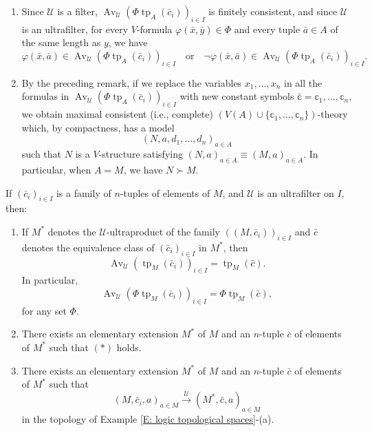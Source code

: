 \documentclass{scrartcl}
\DeclareMathOperator{\Av}{Av }
\DeclareMathOperator{\tp}{tp}
\renewcommand{\phi}{\varphi}
\newcommand{\SU}{\mathscr{U}}
\begin{document}
\begin{remarks}

\begin{enumerate}
\item
Since $\SU$ is a filter, $\Av_{\SU}  (\Phi\tp_A(\bar c_i))_{i\in I}$ is finitely consistent, and since $\SU$ is an ultrafilter, for every $V$-formula $\phi(\bar x, \bar y)\in \Phi$ and every tuple $\bar a\in A$ of the same length as $y$,  we have
\[
\phi(\bar x,\bar a)\in \Av_{\SU} (\Phi\tp_A(\bar c_i))_{i\in I}
\quad\text{or}\quad
\neg\phi(\bar x,\bar a)\in \Av_{\SU} (\Phi\tp_A(\bar c_i))_{i\in I}.
\]
\item
By the preceding remark, if we replace the variables $x_1,\dots, x_n$ in all the formulas in $\Av_{\SU} (\Phi\tp_A(\bar c_i))_{i\in I}$ with new constant symbols $\bar {\mathbb{c}} = \mathbb{c}_1,\dots,  \mathbb{c}_n$, we obtain maximal consistent (i.e., complete) $(V(A)\cup\{ \mathbb{c}_1,\dots,  \mathbb{c}_n\})$-theory which, by compactness, has a model
\[
(N, a, d_1,\dots, d_n)_{a\in A}
\] 
such that $N$ is a $V$-structure satisfying $(N,a)_{a\in A}\equiv(M,a)_{a\in A}$. In particular, when $A=M$, we have $N\succ M$.


\end{enumerate}
\end{remarks}



\begin{theorem}
\label{T:averages are realized}
If  $(\bar{c}_i)_{i\in I}$ is a family of $n$-tuples of elements of $M$, and  $\SU$ is an ultrafilter on $I$, then:
\begin{enumerate}
\item
If $M^*$ denotes the $\SU$-ultraproduct of the family $((M, \bar{c}_i))_{i\in I}$ and $\bar c$ denotes the equivalence class of $(\bar{c}_i )_{i\in I}$ in  $M^*$, then
\[
\tag{$*$}
\Av_{\SU} (\tp_M(\bar c_i))_{i\in I}= \tp_M(\bar{c}).
\]
In particular,
\[
\Av_{\SU} (\Phi\tp_M(\bar c_i))_{i\in I}= \Phi\tp_M(\bar{c}),
\]
for any set $\Phi$.
\item
There exists an elementary extension $M^*$ of $M$ and an $n$-tuple $\bar c$ of elements of $M^*$  such that $(*)$ holds.
\item
There exists an elementary extension $M^*$ of $M$ and an $n$-tuple $\bar c$ of elements of $M^*$  such that 
\[
 (M, \bar{c}_i, a)_{a\in M}\overset{\mathscr{U}}\to (M^*, \bar{c}, a)_{a\in M}
\]
in the topology of Example \ref{E: logic topological spaces}-(a).
\end{enumerate}
\end{theorem}
\end{document}
